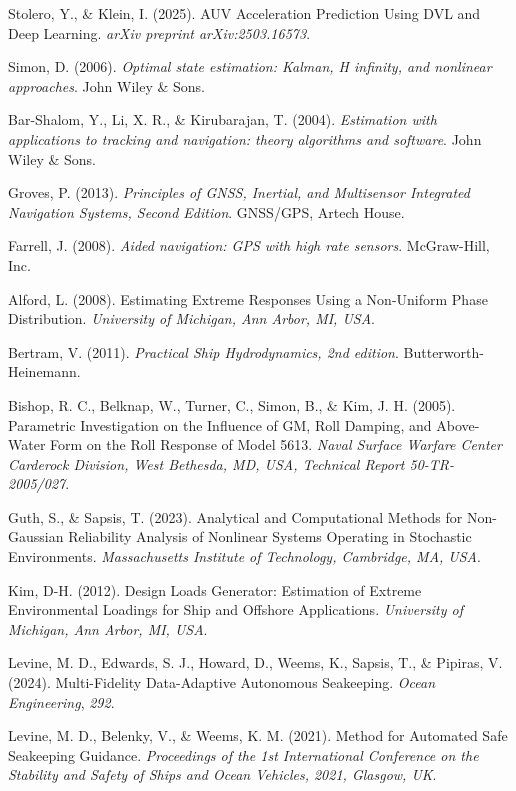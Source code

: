 \documentclass{article}
\begin{document}
\begin{thebibliography}{99}
 Stolero, Y., \& Klein, I. (2025). AUV Acceleration Prediction Using DVL and Deep Learning. \textit{arXiv preprint arXiv:2503.16573}.

 Simon, D. (2006). \textit{Optimal state estimation: Kalman, H infinity, and nonlinear approaches}. John Wiley \& Sons.

 Bar-Shalom, Y., Li, X. R., \& Kirubarajan, T. (2004). \textit{Estimation with applications to tracking and navigation: theory algorithms and software}. John Wiley \& Sons.

 Groves, P. (2013). \textit{Principles of GNSS, Inertial, and Multisensor Integrated Navigation Systems, Second Edition}. GNSS/GPS, Artech House.

 Farrell, J. (2008). \textit{Aided navigation: GPS with high rate sensors}. McGraw-Hill, Inc.

 Alford, L. (2008). Estimating Extreme Responses Using a Non-Uniform Phase Distribution. \textit{University of Michigan, Ann Arbor, MI, USA}.

 Bertram, V. (2011). \textit{Practical Ship Hydrodynamics, 2nd edition}. Butterworth-Heinemann.

 Bishop, R. C., Belknap, W., Turner, C., Simon, B., \& Kim, J. H. (2005). Parametric Investigation on the Influence of GM, Roll Damping, and Above-Water Form on the Roll Response of Model 5613. \textit{Naval Surface Warfare Center Carderock Division, West Bethesda, MD, USA, Technical Report 50-TR-2005/027}.

 Guth, S., \& Sapsis, T. (2023). Analytical and Computational Methods for Non-Gaussian Reliability Analysis of Nonlinear Systems Operating in Stochastic Environments. \textit{Massachusetts Institute of Technology, Cambridge, MA, USA}.

 Kim, D-H. (2012). Design Loads Generator: Estimation of Extreme Environmental Loadings for Ship and Offshore Applications. \textit{University of Michigan, Ann Arbor, MI, USA}.

 Levine, M. D., Edwards, S. J., Howard, D., Weems, K., Sapsis, T., \& Pipiras, V. (2024). Multi-Fidelity Data-Adaptive Autonomous Seakeeping. \textit{Ocean Engineering}, \textit{292}.

 Levine, M. D., Belenky, V., \& Weems, K. M. (2021). Method for Automated Safe Seakeeping Guidance. \textit{Proceedings of the 1st International Conference on the Stability and Safety of Ships and Ocean Vehicles, 2021, Glasgow, UK}.


\end{thebibliography}
\end{document}
